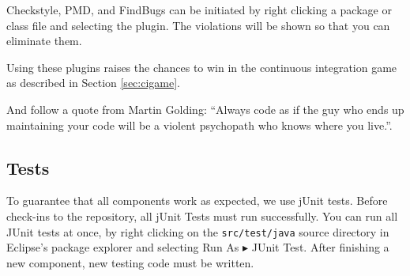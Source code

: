 Checkstyle, PMD, and FindBugs can be initiated by right clicking a package or class file and selecting the plugin. The violations will be shown so that you can eliminate them.

Using these plugins raises the chances to win in the continuous integration game as described in Section \ref{sec:cigame}.

And follow a quote from Martin Golding: ``Always code as if the guy who ends up maintaining your code will be a violent psychopath who knows where you live.''.

\subsection{Tests}

To guarantee that all components work as expected, we use jUnit tests. Before check-ins to the repository, all jUnit Tests must run successfully. You can run all JUnit tests at once, by right clicking on the \texttt{src/test/java} source directory in Eclipse's package explorer and selecting Run As $\blacktriangleright$ JUnit Test. After finishing a new component, new testing code must be written.
